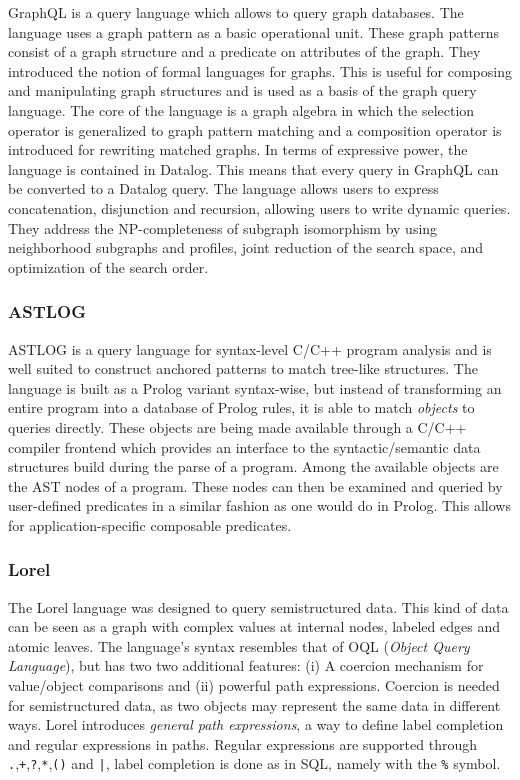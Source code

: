 GraphQL\cite{He:2008} is a query language which allows to query graph databases. The language uses a graph pattern as a basic operational unit. These graph patterns consist of a graph structure and a predicate on attributes of the graph. They introduced the notion of formal languages for graphs. This is useful for composing and manipulating graph structures and is used as a basis of the graph query language.
The core of the language is a graph algebra in which the selection operator is generalized to graph pattern matching and a composition operator is introduced for rewriting matched graphs. In terms of expressive power, the language is contained in Datalog. This means that every query in GraphQL can be converted to a Datalog query. The language allows users to express concatenation, disjunction and recursion, allowing users to write dynamic queries. They address the NP-completeness of subgraph isomorphism by using neighborhood subgraphs and profiles, joint reduction of the search space, and optimization of the search order.

\subsubsection*{ASTLOG}
ASTLOG\cite{Crew:1997} is a query language for syntax-level C/C++ program analysis and is well suited to construct anchored patterns to match tree-like structures. The language is built as a Prolog variant syntax-wise, but instead of transforming an entire program into a database of Prolog rules, it is able to match \textit{objects} to queries directly. These objects are being made available through a C/C++ compiler frontend which provides an interface to the syntactic/semantic data structures build during the parse of a program. Among the available objects are the AST nodes of a program. These nodes can then be examined and queried by user-defined predicates in a similar fashion as one would do in Prolog. This allows for application-specific composable predicates. 

\subsubsection*{Lorel}
The Lorel language\cite{abiteboul1997lorel} was designed to query semistructured data. This kind of data can be seen as a graph with complex values at internal nodes, labeled edges and atomic leaves. The language's syntax resembles that of OQL (\textit{Object Query Language}), but has two two additional features: (i) A coercion mechanism for value/object comparisons and (ii) powerful path expressions. Coercion is needed for semistructured data, as two objects may represent the same data in different ways. Lorel introduces \textit{general path expressions}, a way to define label completion and regular expressions in paths. Regular expressions are supported through \texttt{.},\texttt{+},\texttt{?},\texttt{*},\texttt{()} and \texttt{|}, label completion is done as in SQL, namely with the \texttt{\%} symbol.


